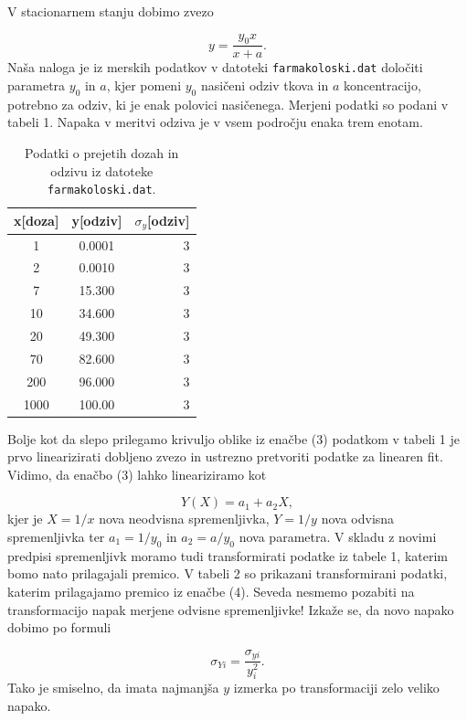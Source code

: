 \documentclass[slovene,11pt,a4paper]{article}
\begin{document}
V stacionarnem stanju dobimo zvezo

\begin{equation}
y = \frac{y_0 x}{x+a}.
\end{equation}
Naša naloga je iz merskih podatkov v datoteki \texttt{farmakoloski.dat} določiti parametra $y_0$ in $a$, kjer pomeni $y_0$ nasičeni odziv tkova in $a$ koncentracijo, potrebno za odziv, ki je enak polovici nasičenega. Merjeni podatki so podani v tabeli 1. Napaka v meritvi odziva je v vsem področju enaka trem enotam.

\begin{table}[h!]
\centering
\begin{tabular}{ccr}
\toprule
x[doza] &  y[odziv] &  $\sigma_y$[odziv] \\
\midrule
   1 &    0.0001 &          3 \\
   2 &    0.0010 &          3 \\
   7 &   15.300 &          3 \\
  10 &   34.600 &          3 \\
  20 &   49.300 &          3 \\
  70 &   82.600 &          3 \\
 200 &   96.000 &          3 \\
1000 &  100.00 &          3 \\
\bottomrule
\end{tabular}
\caption{Podatki o prejetih dozah in odzivu iz datoteke \texttt{farmakoloski.dat}.}
\end{table}

Bolje kot da slepo prilegamo krivuljo oblike iz enačbe (3) podatkom v tabeli 1 je prvo linearizirati dobljeno zvezo in ustrezno pretvoriti podatke za linearen fit. Vidimo, da enačbo (3) lahko lineariziramo kot

\begin{equation}
Y(X) = a_1 + a_2 X,
\end{equation}
kjer je $X = 1/x$ nova neodvisna spremenljivka, $Y = 1/y$ nova odvisna spremenljivka ter $a_1 = 1/y_0$ in $a_2 = a/y_0$ nova parametra. V skladu z novimi predpisi spremenljivk moramo tudi transformirati podatke iz tabele 1, katerim bomo nato prilagajali premico. V tabeli 2 so prikazani transformirani podatki, katerim prilagajamo premico iz enačbe (4). Seveda nesmemo pozabiti na transformacijo napak merjene odvisne spremenljivke! Izkaže se, da novo napako dobimo po formuli

\begin{equation}
\sigma_{Yi} = \frac{\sigma_{yi}}{y_i^2}.
\end{equation}
Tako je smiselno, da imata najmanjša $y$ izmerka po transformaciji zelo veliko napako.
\end{document}
